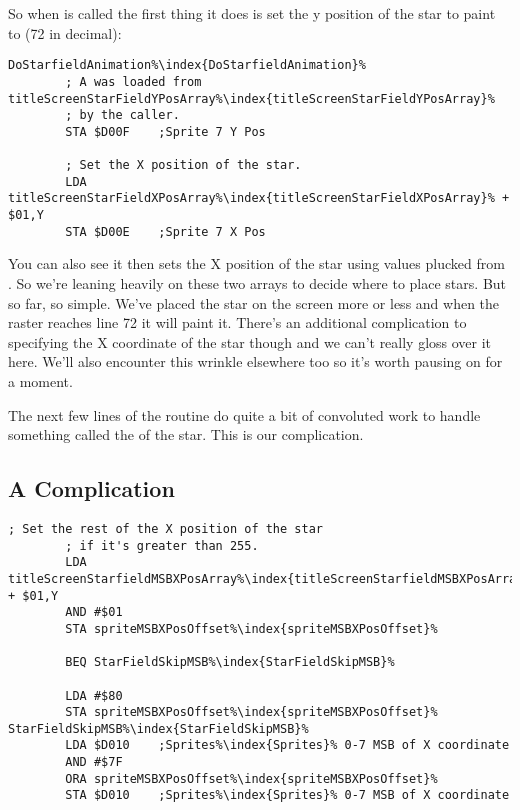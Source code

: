 So when  is called the first thing it does is set the y position of the star to paint
to  (72 in decimal): 

\begin{lstlisting}[caption=The start of \icode{DoStarfieldAnimation\index{DoStarfieldAnimation}} responsible for painting stars.,escapechar=\%]
DoStarfieldAnimation%\index{DoStarfieldAnimation}%   
        ; A was loaded from titleScreenStarFieldYPosArray%\index{titleScreenStarFieldYPosArray}%
        ; by the caller.
        STA $D00F    ;Sprite 7 Y Pos

        ; Set the X position of the star.
        LDA titleScreenStarFieldXPosArray%\index{titleScreenStarFieldXPosArray}% + $01,Y
        STA $D00E    ;Sprite 7 X Pos

\end{lstlisting}

You can also see it then sets the X position of the star using values plucked from .
So we're leaning heavily on these two arrays to decide where to place stars. But so far, so simple. We've placed the star
on the screen more or less and when the raster reaches line 72 it will paint it. There's an additional complication to 
specifying the X coordinate of the star though and we can't really gloss over it here. We'll also encounter this
wrinkle elsewhere too so it's worth pausing on for a moment.

The next few lines of the routine do quite a bit of convoluted work to handle something called the  of the
star. This is our complication. 

\subsection{A Complication}
\begin{lstlisting}[caption= MSBXPos.. some'it.,escapechar=\%]
        ; Set the rest of the X position of the star
        ; if it's greater than 255.
        LDA titleScreenStarfieldMSBXPosArray%\index{titleScreenStarfieldMSBXPosArray}% + $01,Y
        AND #$01
        STA spriteMSBXPosOffset%\index{spriteMSBXPosOffset}%

        BEQ StarFieldSkipMSB%\index{StarFieldSkipMSB}%

        LDA #$80
        STA spriteMSBXPosOffset%\index{spriteMSBXPosOffset}%
StarFieldSkipMSB%\index{StarFieldSkipMSB}%   
        LDA $D010    ;Sprites%\index{Sprites}% 0-7 MSB of X coordinate
        AND #$7F
        ORA spriteMSBXPosOffset%\index{spriteMSBXPosOffset}%
        STA $D010    ;Sprites%\index{Sprites}% 0-7 MSB of X coordinate

\end{lstlisting}

